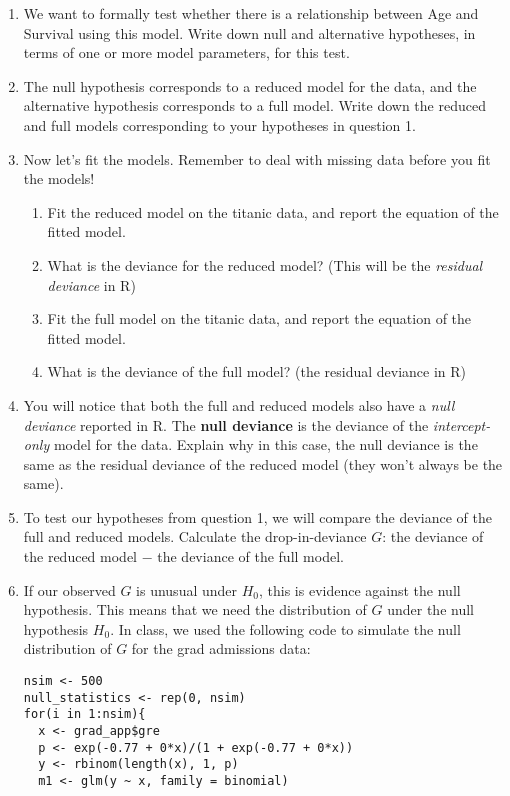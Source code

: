 \documentclass[11pt]{article}
\begin{document}
\begin{enumerate}
\item We want to formally test whether there is a relationship between Age and Survival using this model. Write down null and alternative hypotheses, in terms of one or more model parameters, for this test.

\item The null hypothesis corresponds to a reduced model for the data, and the alternative hypothesis corresponds to a full model. Write down the reduced and full models corresponding to your hypotheses in question 1.

\item Now let's fit the models. Remember to deal with missing data before you fit the models!
\begin{enumerate}
\item Fit the reduced model on the titanic data, and report the equation of the fitted model.

\item What is the deviance for the reduced model? (This will be the \textit{residual deviance} in R)

\item Fit the full model on the titanic data, and report the equation of the fitted model.

\item What is the deviance of the full model? (the residual deviance in R)
\end{enumerate}

\item You will notice that both the full and reduced models also have a \textit{null deviance} reported in R. The \textbf{null deviance} is the deviance of the \textit{intercept-only} model for the data. Explain why in this case, the null deviance is the same as the residual deviance of the reduced model (they won't always be the same).

\item To test our hypotheses from question 1, we will compare the deviance of the full and reduced models. Calculate the drop-in-deviance $G$: the deviance of the reduced model $-$ the deviance of the full model.

\item If our observed $G$ is unusual under $H_0$, this is evidence against the null hypothesis. This means that we need the distribution of $G$ under the null hypothesis $H_0$. In class, we used the following code to simulate the null distribution of $G$ for the grad admissions data:
\begin{verbatim}
nsim <- 500
null_statistics <- rep(0, nsim)
for(i in 1:nsim){
  x <- grad_app$gre
  p <- exp(-0.77 + 0*x)/(1 + exp(-0.77 + 0*x))
  y <- rbinom(length(x), 1, p)
  m1 <- glm(y ~ x, family = binomial)
  

\end{verbatim}
\end{enumerate}
\end{document}
